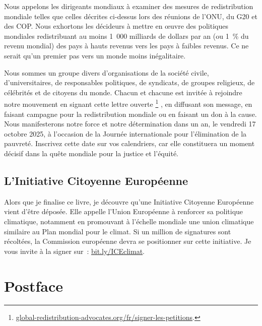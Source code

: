 \documentclass[a5paper,french,openany]{memoir}
\begin{document}
Nous appelons les dirigeants mondiaux à examiner des mesures de redistribution mondiale telles que celles décrites ci-dessus lors des réunions de l'ONU, du G20 et des COP. Nous exhortons les décideurs à mettre en œuvre des politiques mondiales redistribuant au moins 1~000 milliards de dollars par an (ou 1~\% du revenu mondial) des pays à hauts revenus vers les pays à faibles revenus. Ce ne serait qu'un premier pas vers un monde moins inégalitaire.

Nous sommes un groupe divers d'organisations de la société civile, d'universitaires, de responsables politiques, de syndicats, de groupes religieux, de célébrités et de citoyens du monde. Chacun et chacune est invitée à rejoindre notre mouvement en signant cette lettre ouverte
\footnote{\href{https://global-redistribution-advocates.org/fr/signer-les-petitions/?238=true}{global-redistribution-advocates.org/fr/signer-les-petitions}.}%
, en diffusant son message, en faisant campagne pour la redistribution mondiale ou en faisant un don à la cause. Nous manifesterons notre force et notre détermination dans un an, le vendredi 17 octobre 2025, à l'occasion de la Journée internationale pour l'élimination de la pauvreté. Inscrivez cette date sur vos calendriers, car elle constituera un moment décisif dans la quête mondiale pour la justice et l'équité.

\section{L'Initiative Citoyenne Européenne}

Alors que je finalise ce livre, je découvre qu'une Initiative Citoyenne Européenne vient d'être déposée. %
Elle appelle l'Union Européenne à renforcer sa politique climatique, notamment en promouvant à l'échelle mondiale une union climatique similaire au Plan mondial pour le climat. Si un million de signatures sont récoltées, la Commission européenne devra se positionner sur cette initiative. Je vous invite à la signer sur~: \href{https://citizens-initiative.europa.eu/initiatives/details/2024/000005_fr}{bit.ly/ICEclimat}.

\chapter{Postface}
\end{document}
